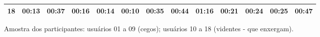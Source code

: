 \begin{center}
\begin{sideways}
\begin{tabular}{|l|l|l|l|l|l|l|l|l|l|l|l|l|}
\hline
\multicolumn{1}{|c|}{18} & 
\multicolumn{1}{c|}{00:13} & \multicolumn{1}{c|}{00:37} & \multicolumn{1}{c|}{00:16} & \multicolumn{1}{c|}{00:14} & \multicolumn{1}{c|}{00:10}	& \multicolumn{1}{c|}{00:35} & \multicolumn{1}{c|}{00:44} & \multicolumn{1}{c|}{01:16} & \multicolumn{1}{c|}{00:21} & \multicolumn{1}{c|}{00:24} & \multicolumn{1}{c|}{00:25} & \multicolumn{1}{c|}{00:47} \\ 
\hline
\end{tabular}
\end{sideways}
\end{center}
\normalsize

Amostra dos participantes: usuários 01 a 09 (cegos); usuários 10 a 18 (videntes - que enxergam).





